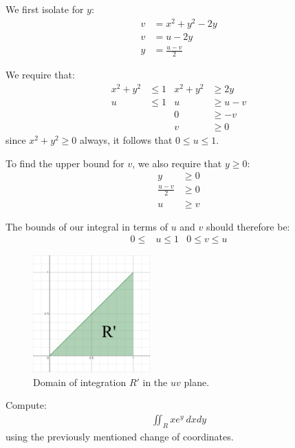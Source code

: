 \begin{solution}
    We first isolate for \(y\):
    \begin{align*}
        v &= x^2 + y^2 - 2y \\
        v &= u - 2y \\
        y &= \frac{u - v}{2}
    \end{align*}
    
    We require that:
    \begin{align*}
        x^2 + y^2 &\leq 1 & x^2 + y^2 &\geq 2y\\
        u &\leq 1 & u &\geq u - v \\
        & & 0 &\geq - v \\
        & & v &\geq 0
    \end{align*}
    since \(x^2 + y^2 \geq 0\) always, it follows that \(0 \leq u \leq 1\).
    
    To find the upper bound for \(v\), we also require that \(y \geq 0\):
    \begin{align*}
        y &\geq 0 \\
        \frac{u - v}{2} &\geq 0 \\
        u &\geq v
    \end{align*}
    
    The bounds of our integral in terms of \(u\) and \(v\) should therefore be:
    \begin{align}
        0 \leq &u \leq 1 & 0 \leq v \leq u 
    \end{align}
    
    \begin{figure}[h!]
        \centering
        \includegraphics[width=0.4\textwidth]{Pictures/Tutorial 6-4.png}
        \caption{Domain of integration \(R'\) in the \(uv\) plane.}
    \end{figure}
\end{solution}

\begin{tcolorbox}[
        title={Problem 36 (c)},
        valign=center,
        nobeforeafter,
        colframe=gray!95!black
    ]
    Compute:
    \begin{align}
        \iint_R xe^y \ dxdy
    \end{align}
    using the previously mentioned change of coordinates.
\end{tcolorbox}


